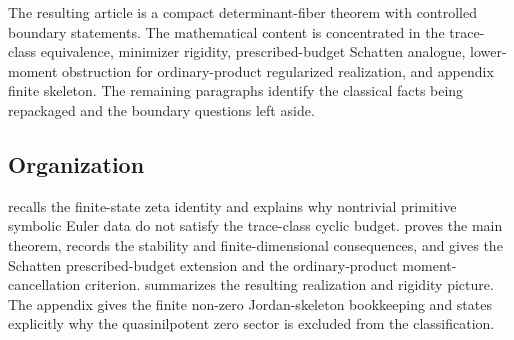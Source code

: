 The resulting article is a compact determinant-fiber theorem with controlled
boundary statements.  The mathematical content is concentrated in the
trace-class equivalence, minimizer rigidity, prescribed-budget Schatten
analogue, lower-moment obstruction for ordinary-product regularized
realization, and appendix finite skeleton.  The remaining paragraphs identify
the classical facts being repackaged and the boundary questions left aside.
\subsection{Organization}

 recalls the finite-state zeta identity and explains
why nontrivial primitive symbolic Euler data do not satisfy the trace-class
cyclic budget.   proves the main theorem, records the
stability and finite-dimensional consequences, and gives the Schatten
prescribed-budget extension and the ordinary-product moment-cancellation
criterion.   summarizes the resulting
realization and rigidity picture.  The appendix gives the finite non-zero
Jordan-skeleton bookkeeping and states explicitly why the quasinilpotent zero
sector is excluded from the classification.
